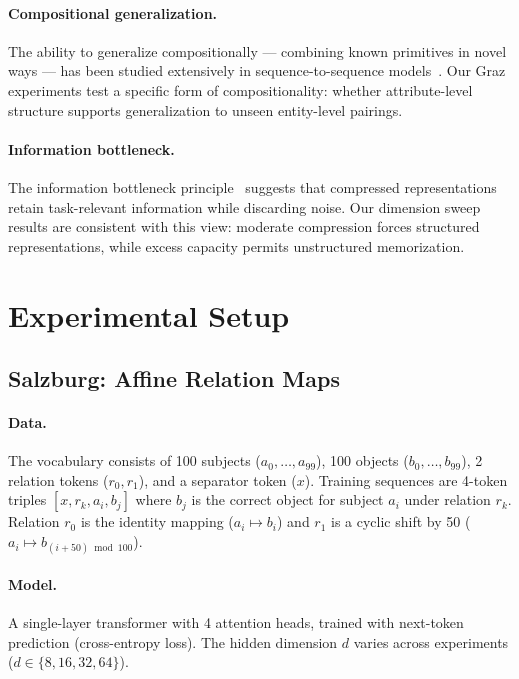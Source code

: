 \documentclass[11pt]{article}
\begin{document}
\paragraph{Compositional generalization.}
The ability to generalize compositionally --- combining known primitives in novel ways
--- has been studied extensively in sequence-to-sequence models~\cite{lake2018,kim2020}.
Our Graz experiments test a specific form of compositionality: whether attribute-level
structure supports generalization to unseen entity-level pairings.

\paragraph{Information bottleneck.}
The information bottleneck principle~\cite{tishby2000} suggests that compressed
representations retain task-relevant information while discarding noise. Our dimension
sweep results are consistent with this view: moderate compression forces structured
representations, while excess capacity permits unstructured memorization.

\section{Experimental Setup}

\subsection{Salzburg: Affine Relation Maps}

\paragraph{Data.}
The vocabulary consists of 100 subjects ($a_0, \ldots, a_{99}$), 100 objects
($b_0, \ldots, b_{99}$), 2 relation tokens ($r_0, r_1$), and a separator token ($x$).
Training sequences are 4-token triples $[x, r_k, a_i, b_j]$ where $b_j$ is the correct
object for subject $a_i$ under relation $r_k$. Relation $r_0$ is the identity mapping
($a_i \mapsto b_i$) and $r_1$ is a cyclic shift by 50 ($a_i \mapsto b_{(i+50) \bmod 100}$).

\paragraph{Model.}
A single-layer transformer with 4 attention heads, trained with next-token prediction
(cross-entropy loss). The hidden dimension $d$ varies across experiments
($d \in \{8, 16, 32, 64\}$).
\end{document}
